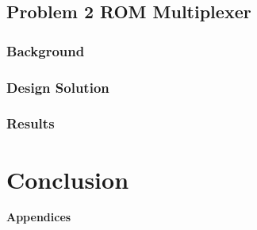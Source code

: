\documentclass[11pt]{article}
\begin{document}
\subsection{Problem 2 ROM Multiplexer}

\subsubsection{Background}

\subsubsection{Design Solution}

\subsubsection{Results}

\section{Conclusion}

\pagebreak

\textbf{Appendices}
\end{document}
